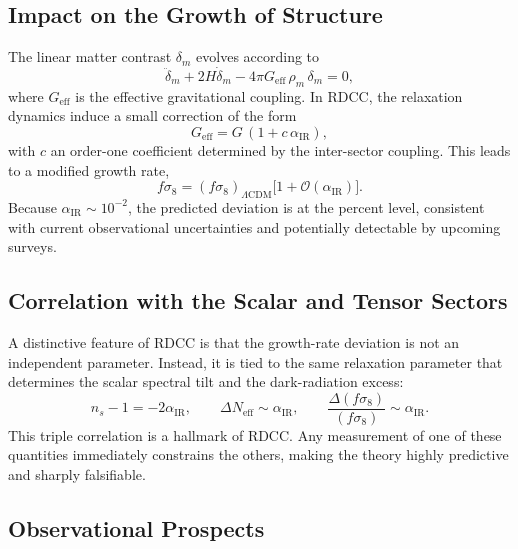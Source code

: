 \documentclass[11pt,a4paper]{article}
\begin{document}
\subsection{Impact on the Growth of Structure}

The linear matter contrast $\delta_m$ evolves according to
\begin{equation}
    \ddot{\delta}_m + 2H\dot{\delta}_m
    - 4\pi G_{\mathrm{eff}}\,\rho_m\,\delta_m = 0,
\end{equation}
where $G_{\mathrm{eff}}$ is the effective gravitational coupling. In RDCC, the relaxation
dynamics induce a small correction of the form
\begin{equation}
    G_{\mathrm{eff}} = G\,(1 + c\,\alpha_{\mathrm{IR}}),
\end{equation}
with $c$ an order-one coefficient determined by the inter-sector coupling. This leads to
a modified growth rate,
\begin{equation}
    f\sigma_8
    = (f\sigma_8)_{\Lambda\mathrm{CDM}}
      \bigl[1 + \mathcal{O}(\alpha_{\mathrm{IR}})\bigr].
\end{equation}
Because $\alpha_{\mathrm{IR}} \sim 10^{-2}$, the predicted deviation is at the percent level,
consistent with current observational uncertainties and potentially detectable by
upcoming surveys.

\subsection{Correlation with the Scalar and Tensor Sectors}

A distinctive feature of RDCC is that the growth-rate deviation is not an independent
parameter. Instead, it is tied to the same relaxation parameter that determines the
scalar spectral tilt and the dark-radiation excess:
\begin{equation}
    n_s - 1 = -2\alpha_{\mathrm{IR}}, \qquad
    \Delta N_{\mathrm{eff}} \sim \alpha_{\mathrm{IR}}, \qquad
    \frac{\Delta(f\sigma_8)}{(f\sigma_8)} \sim \alpha_{\mathrm{IR}}.
\end{equation}
This triple correlation is a hallmark of RDCC. Any measurement of one of these
quantities immediately constrains the others, making the theory highly predictive and
sharply falsifiable.

\subsection{Observational Prospects}
\end{document}
